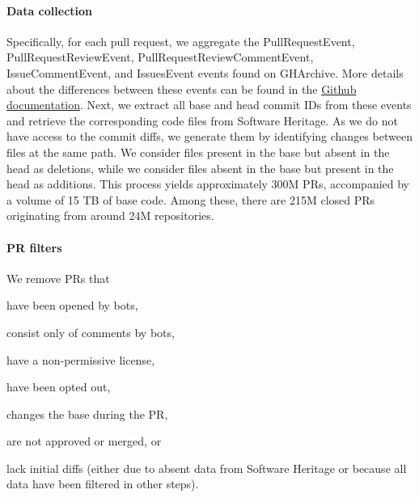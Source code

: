 \documentclass[10pt]{article} %
\begin{document}

\paragraph{Data collection} Specifically, for each pull request, we aggregate the PullRequestEvent, PullRequestReviewEvent, PullRequestReviewCommentEvent, IssueCommentEvent, and IssuesEvent events found on GHArchive. More details about the differences between these events can be found in the \href{https://docs.github.com/en/rest/using-the-rest-api/github-event-types?apiVersion=2022-11-28}{Github documentation}. Next, we extract all base and head commit IDs from these events and retrieve the corresponding code files from Software Heritage. As we do not have access to the commit diffs, we generate them by identifying changes between files at the same path. We consider files present in the base but absent in the head as deletions, while we consider files absent in the base but present in the head as additions. This process yields approximately 300M PRs, accompanied by a volume of 15 TB of base code. Among these, there are 215M closed PRs originating from around 24M repositories.

\paragraph{PR filters} We remove PRs that 
\begin{inparaenum}[1)]
    \item have been opened by bots,
    \item consist only of comments by bots,
    \item have a non-permissive license,
    \item have been opted out,
    \item changes the base during the PR,
    \item are not approved or merged, or
    \item lack initial diffs (either due to absent data from Software Heritage or because all data have been filtered in other steps).
\end{inparaenum}
\end{document}
